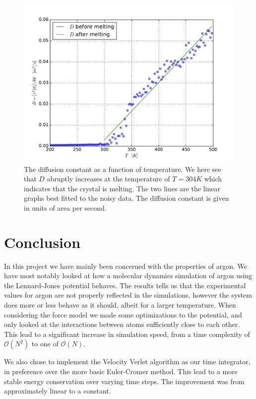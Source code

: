 \documentclass[a4paper]{article}
\begin{document}
    \begin{figure}[h]
        \centering
        \includegraphics[width=0.8\linewidth]{diffusion_constant.pdf}
        \caption[Diffusion constant]{The diffusion constant as a function of
            temperature. We here see that $D$ abruptly increases at the
            temperature of $T = 304K$ which indicates that the crystal is
        melting. The two lines are the linear graphs best fitted to the noisy
    data.  The diffusion constant is given in units of area per second.}
        \label{fig:diffusion_constant}
    \end{figure}
\clearpage

\section{Conclusion}
\label{sec:conclusion}

In this project we have mainly been concerned with the properties of argon. We
have most notably looked at how a molecular dynamics simulation of argon using
the Lennard-Jones potential behaves.  The results tells us that the
experimental values for argon are not properly reflected in the simulations,
however the system does more or less behave as it should, albeit for a larger
temperature. When considering the force model we made some optimizations to the
potential, and only looked at the interactions between atoms sufficiently close
to each other. This lead to a significant increase in simulation speed, from a
time complexity of $\mathcal{O}(N^2)$ to one of $\mathcal{O}(N)$.

We also chose to implement the Velocity Verlet algorithm as our time
integrator, in preference over the more basic Euler-Cromer method. This lead to
a more stable energy conservation over varying time steps. The improvement was
from approximately linear to a constant. 
\end{document}
